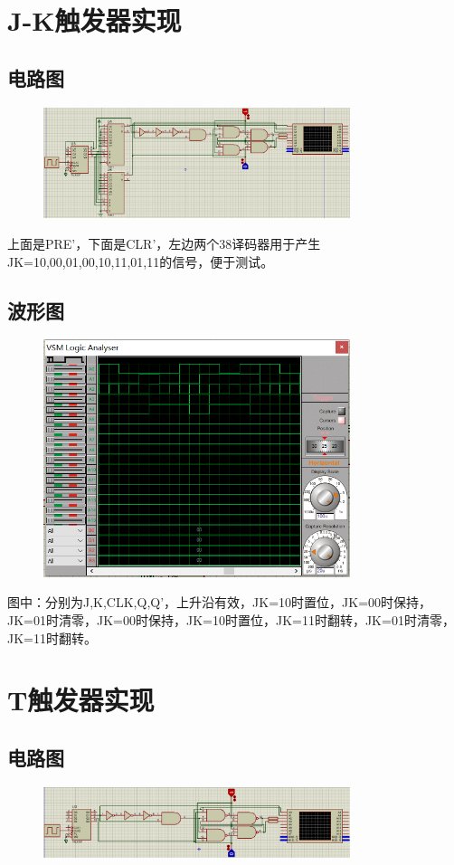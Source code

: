 \documentclass[UTF8, a4paper, 11pt]{article}
\begin{document}
\section{J-K触发器实现}
\subsection{电路图}
\begin{figure}[H]
    \centering
    \includegraphics[width=0.8\textwidth]{ex9.8电路图.png}
\end{figure}
上面是PRE'，下面是CLR'，左边两个38译码器用于产生JK=10,00,01,00,10,11,01,11的信号，便于测试。
\subsection{波形图}
\begin{figure}[H]
    \centering
    \includegraphics[width=0.8\textwidth]{ex9.8波形图.png}
\end{figure}
图中：分别为J,K,CLK,Q,Q'，上升沿有效，JK=10时置位，JK=00时保持，JK=01时清零，JK=00时保持，JK=10时置位，JK=11时翻转，JK=01时清零，JK=11时翻转。
\section{T触发器实现}
\subsection{电路图}
\begin{figure}[H]
    \centering
    \includegraphics[width=0.8\textwidth]{ex9.9电路图.png}
\end{figure}
\end{document}
